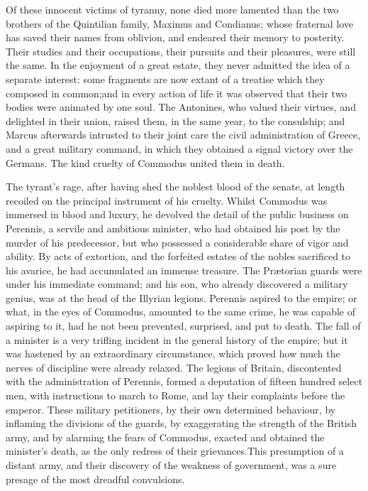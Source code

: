 
Of these innocent victims of tyranny, none died more lamented
than the two brothers of the Quintilian family, Maximus and
Condianus; whose fraternal love has saved their names from
oblivion, and endeared their memory to posterity. Their studies
and their occupations, their pursuits and their pleasures, were
still the same. In the enjoyment of a great estate, they never
admitted the idea of a separate interest: some fragments are now
extant of a treatise which they composed in common;\footnotemark[152] and in
every action of life it was observed that their two bodies were
animated by one soul. The Antonines, who valued their virtues,
and delighted in their union, raised them, in the same year, to
the consulship; and Marcus afterwards intrusted to their joint
care the civil administration of Greece, and a great military
command, in which they obtained a signal victory over the
Germans. The kind cruelty of Commodus united them in death.\footnotemark[16]



The tyrant’s rage, after having shed the noblest blood of the
senate, at length recoiled on the principal instrument of his
cruelty. Whilst Commodus was immersed in blood and luxury, he
devolved the detail of the public business on Perennis, a servile
and ambitious minister, who had obtained his post by the murder
of his predecessor, but who possessed a considerable share of
vigor and ability. By acts of extortion, and the forfeited
estates of the nobles sacrificed to his avarice, he had
accumulated an immense treasure. The Prætorian guards were under
his immediate command; and his son, who already discovered a
military genius, was at the head of the Illyrian legions.
Perennis aspired to the empire; or what, in the eyes of Commodus,
amounted to the same crime, he was capable of aspiring to it, had
he not been prevented, surprised, and put to death. The fall of a
minister is a very trifling incident in the general history of
the empire; but it was hastened by an extraordinary circumstance,
which proved how much the nerves of discipline were already
relaxed. The legions of Britain, discontented with the
administration of Perennis, formed a deputation of fifteen
hundred select men, with instructions to march to Rome, and lay
their complaints before the emperor. These military petitioners,
by their own determined behaviour, by inflaming the divisions of
the guards, by exaggerating the strength of the British army, and
by alarming the fears of Commodus, exacted and obtained the
minister’s death, as the only redress of their grievances.\footnotemark[17]
This presumption of a distant army, and their discovery of the
weakness of government, was a sure presage of the most dreadful
convulsions.

